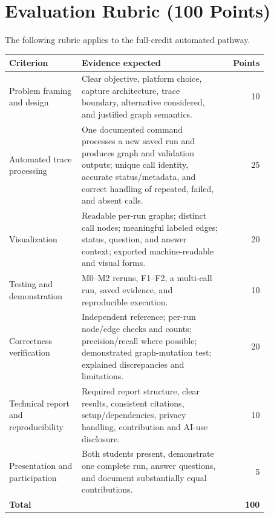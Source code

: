 \documentclass[11pt]{article}
\begin{document}
\section{Evaluation Rubric (100 Points)}
The following rubric applies to the full-credit automated pathway.
\renewcommand{\arraystretch}{1.15}
\begin{longtable}{p{0.28\linewidth}p{0.57\linewidth}r}
  \toprule
  Criterion                            & Evidence expected                                                                                                                                                                                       & Points       \\
  \midrule
  \endhead
  Problem framing and design           & Clear objective, platform choice, capture architecture, trace boundary, alternative considered, and justified graph semantics.                                                                          & 10           \\
  Automated trace processing           & One documented command processes a new saved run and produces graph and validation outputs; unique call identity, accurate status/metadata, and correct handling of repeated, failed, and absent calls. & 25           \\
  Visualization                        & Readable per-run graphs; distinct call nodes; meaningful labeled edges; status, question, and answer context; exported machine-readable and visual forms.                                               & 20           \\
  Testing and demonstration            & M0--M2 reruns, F1--F2, a multi-call run, saved evidence, and reproducible execution.                                                                                                                    & 10           \\
  Correctness verification             & Independent reference; per-run node/edge checks and counts; precision/recall where possible; demonstrated graph-mutation test; explained discrepancies and limitations.                                 & 20           \\
  Technical report and reproducibility & Required report structure, clear results, consistent citations, setup/dependencies, privacy handling, contribution and AI-use disclosure.                                                               & 10           \\
  Presentation and participation       & Both students present, demonstrate one complete run, answer questions, and document substantially equal contributions.                                                                                  & 5            \\
  \midrule
  \textbf{Total}                       &                                                                                                                                                                                                         & \textbf{100} \\
  \bottomrule
\end{longtable}
\end{document}
